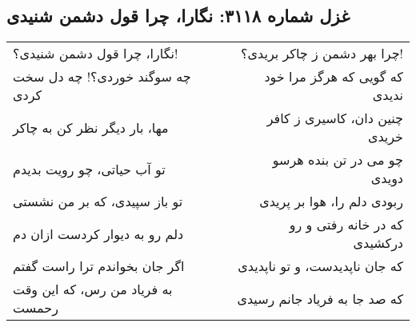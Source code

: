 \begin{center}
\section*{غزل شماره ۳۱۱۸: نگارا، چرا قول دشمن شنیدی}
\label{sec:3118}
\begin{longtable}{l p{0.5cm} r}
نگارا، چرا قول دشمن شنیدی؟!
&&
چرا بهر دشمن ز چاکر بریدی؟!
\\
چه سوگند خوردی؟! چه دل سخت کردی
&&
که گویی که هرگز مرا خود ندیدی
\\
مها، بار دیگر نظر کن به چاکر
&&
چنین دان، کاسیری ز کافر خریدی
\\
تو آب حیاتی، چو رویت بدیدم
&&
چو می در تن بنده هرسو دویدی
\\
تو باز سپیدی، که بر من نشستی
&&
ربودی دلم را، هوا بر پریدی
\\
دلم رو به دیوار کردست ازان دم
&&
که در خانه رفتی و رو درکشیدی
\\
اگر جان بخواندم ترا راست گفتم
&&
که جان ناپدیدست، و تو ناپدیدی
\\
به فریاد من رس، که این وقت رحمست
&&
که صد جا به فریاد جانم رسیدی
\\
\end{longtable}
\end{center}
